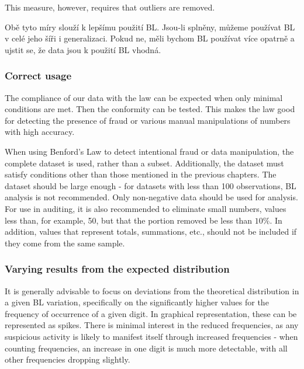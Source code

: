 This measure, however, requires that outliers are removed. 

\begin{koment}
    Obě tyto míry slouží k lepšímu použití BL. Jsou-li splněny, můžeme používat BL v celé jeho šíři i generalizaci. Pokud ne, měli bychom BL používat více opatrně a ujstit se, že data jsou k použití BL vhodná.
\end{koment}
 
\subsubsection*{Correct usage} 

The compliance of our data with the law can be expected when only minimal conditions are met. Then the conformity can be tested. This makes the law good for detecting the presence of fraud or various manual manipulations of numbers with high accuracy. \cite{kossovsky2014benford, Cerqueti2202,kossovsky2014benford} 

When using Benford's Law to detect intentional fraud or data manipulation, the complete dataset is used, rather than a subset. Additionally, the dataset must satisfy conditions other than those mentioned in the previous chapters. The dataset should be large enough - for datasets with less than 100 observations, BL analysis is not recommended. %
Only non-negative data should be used for analysis. For use in auditing, it is also recommended to eliminate small numbers, values less than, for example, 50, but that the portion removed be less than $10\%$. In addition, values that represent totals, summations, etc., should not be included if they come from the same sample. \cite{kossovsky2014benford} %

\subsubsection*{Varying results from the expected distribution}

It is generally advisable to focus on deviations from the theoretical distribution in a given BL variation, specifically on the significantly higher values for the frequency of occurrence of a given digit. In graphical representation, these can be represented as spikes. There is minimal interest in the reduced frequencies, as any suspicious activity is likely to manifest itself through increased frequencies - when counting frequencies, an increase in one digit is much more detectable, with all other frequencies dropping slightly. \cite{kossovsky2014benford} %

